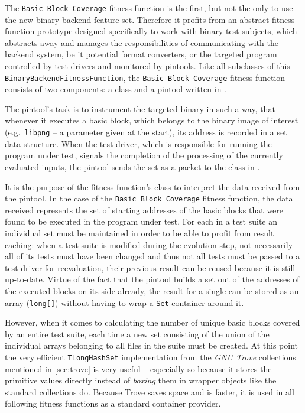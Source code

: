 The \texttt{Basic Block Coverage} fitness function is the first, but not the only to use the new binary 
backend feature set. Therefore it profits from an abstract fitness function prototype designed specifically 
to work with binary test subjects, which abstracts away and manages the responsibilities of communicating 
with the backend system, be it potential format converters, or the targeted program controlled by test 
drivers and monitored by pintools.
Like all subclasses of this \texttt{BinaryBackendFitnessFunction}, the \texttt{Basic Block Coverage} 
fitness function consists of two components: a \java class and a pintool written in \cpp.

The pintool's task is to instrument the targeted binary in such a way, that whenever it executes a 
basic block, which belongs to the binary image of interest (e.g.\ \texttt{libpng} -- a parameter given at the
start), its address is recorded in a set data structure. When the test driver, which is responsible for running 
the program under test, signals the completion of the processing of the currently evaluated inputs, 
the pintool sends the set as a packet to the \java class in \xmlmate.

It is the purpose of the fitness function's \java class to interpret the data received from the pintool.
In the case of the \texttt{Basic Block Coverage} fitness function, the data received represents the
set of starting addresses of the basic blocks that were found to be executed in the program under test. 
For each \xml in a test suite an individual set must be maintained in order to be able to profit 
from result caching: when a test suite is modified during the evolution step, not necessarily all
of its tests must have been changed and thus not all tests must be passed to a test driver for reevaluation, 
their previous result can be reused because it is still up-to-date. Virtue of the fact that the pintool 
builds a set out of the addresses of the executed blocks on its side already, the result for a single 
\xml can be stored as an array (\texttt{long[]}) without having to wrap a \texttt{Set} container around it.

However, when it comes to calculating the number of unique basic blocks covered by an 
entire test suite, each time a new set consisting of the union of the individual arrays belonging to all \xml
files in the suite must be created. At this point the very efficient \texttt{TLongHashSet} implementation from
the \emph{GNU Trove} collections mentioned in \cref{sec:trove} is very useful -- especially so because it
stores the \java primitive values directly instead of \emph{boxing} them in wrapper objects like the standard
\java collections do. Because Trove saves space and is faster, it is used in all following fitness functions
as a standard container provider.

